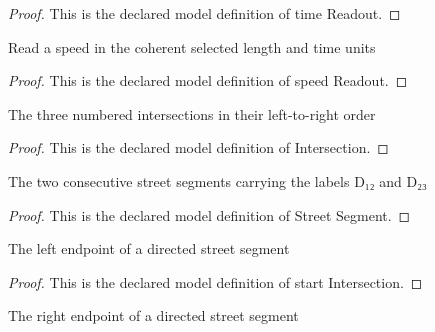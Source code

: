 \begin{proof}
  This is the declared model definition of time Readout.
\end{proof}
\begin{definition}
  \label{def:physics:phyx-mini-0732:phyxminiproblems-problemphyxmini0732-speedreadout}
  Read a speed in the coherent selected length and time units
\end{definition}
\begin{proof}
  This is the declared model definition of speed Readout.
\end{proof}
\begin{definition}[Intersection]
  \label{def:physics:phyx-mini-0732:phyxminiproblems-problemphyxmini0732-intersection}
  The three numbered intersections in their left-to-right order
\end{definition}
\begin{proof}
  This is the declared model definition of Intersection.
\end{proof}
\begin{definition}
  \label{def:physics:phyx-mini-0732:phyxminiproblems-problemphyxmini0732-streetsegment}
  The two consecutive street segments carrying the labels D₁₂ and D₂₃
\end{definition}
\begin{proof}
  This is the declared model definition of Street Segment.
\end{proof}
\begin{definition}
  \label{def:physics:phyx-mini-0732:phyxminiproblems-problemphyxmini0732-streetsegment-startintersection}
  The left endpoint of a directed street segment
\end{definition}
\begin{proof}
  This is the declared model definition of start Intersection.
\end{proof}
\begin{definition}
  \label{def:physics:phyx-mini-0732:phyxminiproblems-problemphyxmini0732-streetsegment-finishintersection}
  The right endpoint of a directed street segment
\end{definition}
